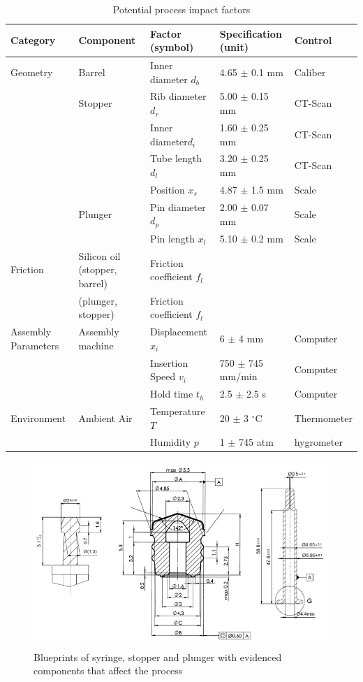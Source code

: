 \begin{table}[h]
\def\arraystretch{1.5}
\caption{Potential process impact factors}
	\begin{tabular}{p{2 cm} p{2 cm} l l l}
	Category & Component & Factor (symbol) & Specification (unit)& Control  \\
    \hline
    Geometry& Barrel 	& Inner diameter $d_b$& 4.65 $\pm$ 0.1 mm& Caliber\\
    		& Stopper 	& Rib diameter	$d_r$& 5.00 $\pm$ 0.15 mm& CT-Scan\\
			& 			& Inner diameter$d_i$& 1.60 $\pm$ 0.25 mm& CT-Scan\\
            &			& Tube length	$d_l$& 3.20 $\pm$ 0.25 mm& CT-Scan\\
            &			& Position 		$x_s$& 4.87 $\pm$ 1.5 mm& Scale\\
			& Plunger	& Pin diameter	$d_p$& 2.00 $\pm$ 0.07 mm& Scale\\
            &			& Pin length	$x_l$& 5.10 $\pm$ 0.2 mm& Scale\\
    Friction& Silicon oil (stopper, barrel)& Friction coefficient $f_l$&				&	\\
            & (plunger, stopper)& Friction coefficient $f_l$ &				&	\\
  Assembly Parameters&Assembly machine	& Displacement	$x_i$& 6 $\pm$ 4 mm& Computer\\
   					&					&Insertion Speed	$v_i$		& 750 $\pm$ 745 mm/min& Computer\\
                    &					& Hold time	$t_h$	& 2.5 $\pm$ 2.5 s	& Computer\\
  Environment& Ambient Air		& Temperature $T$& 20 $\pm$ 3 $^{\circ}$C & Thermometer\\
   					&					&Humidity	$p$		& 1 $\pm$ 745 atm& hygrometer 
    \end{tabular}
\end{table}

\begin{figure}[h!]	
	\centering
\includegraphics[height=7cm]{img/blueprint.PNG}
   \caption{Blueprints of syringe, stopper and plunger with evidenced components that affect the process}
 \label{fgr:PFS}
\end{figure}

